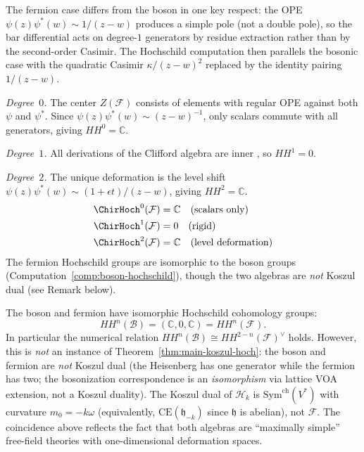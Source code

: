 \begin{computation}
\label{comp:fermion-hochschild}

The fermion case differs from the boson in one key respect: the OPE $\psi(z)\psi^*(w) \sim 1/(z-w)$ produces a simple pole (not a double pole), so the bar differential acts on degree-$1$ generators by residue extraction rather than by the second-order Casimir. The Hochschild computation then parallels the bosonic case with the quadratic Casimir $\kappa/(z-w)^2$ replaced by the identity pairing $1/(z-w)$.

\emph{Degree~$0$.} The center $Z(\mathcal{F})$ consists of elements with regular OPE against both $\psi$ and $\psi^*$. Since $\psi(z)\psi^*(w) \sim (z-w)^{-1}$, only scalars commute with all generators, giving $HH^0 = \mathbb{C}$.

\emph{Degree~$1$.} All derivations of the Clifford algebra are inner \cite[Ch.~9]{Weibel94}, so $HH^1 = 0$.

\emph{Degree~$2$.} The unique deformation is the level shift $\psi(z)\psi^*(w) \sim (1+\epsilon t)/(z-w)$, giving $HH^2 = \mathbb{C}$.
\begin{align}
\ChirHoch^0(\mathcal{F}) &= \mathbb{C} \quad \text{(scalars only)} \\
\ChirHoch^1(\mathcal{F}) &= 0 \quad \text{(rigid)} \\
\ChirHoch^2(\mathcal{F}) &= \mathbb{C} \quad \text{(level deformation)}
\end{align}
The fermion Hochschild groups are isomorphic to the boson groups (Computation~\ref{comp:boson-hochschild}), though the two algebras are \emph{not} Koszul dual (see Remark below).
\end{computation}

\begin{remark}
The boson and fermion have isomorphic Hochschild cohomology groups:
\[
HH^n(\mathcal{B}) = (\mathbb{C}, 0, \mathbb{C}) = HH^n(\mathcal{F}).
\]
In particular the numerical relation $HH^n(\mathcal{B}) \cong HH^{2-n}(\mathcal{F})^{\vee}$ holds.
However, this is \emph{not} an instance of Theorem~\ref{thm:main-koszul-hoch}: the boson and fermion are
\emph{not} Koszul dual (the Heisenberg has one generator
while the fermion has two; the bosonization correspondence is an \emph{isomorphism} via lattice VOA extension, not a Koszul duality).  The Koszul dual of $\mathcal{H}_k$ is $\mathrm{Sym}^{\mathrm{ch}}(V^*)$ with curvature $m_0 = -k\omega$ (equivalently, $\mathrm{CE}(\mathfrak{h}_{-k})$ since $\mathfrak{h}$ is abelian),
not $\mathcal{F}$.  The coincidence above reflects the fact that both algebras are
``maximally simple'' free-field theories with one-dimensional deformation spaces.
\end{remark}

